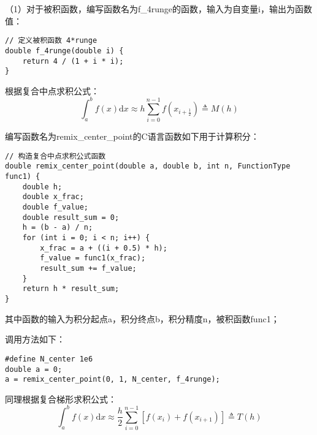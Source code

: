 \documentclass{homework}
\begin{document}

\jie （1）对于被积函数，编写函数名为f\_4runge的函数，输入为自变量i，输出为函数值：
\begin{lstlisting}
// 定义被积函数 4*runge
double f_4runge(double i) {
    return 4 / (1 + i * i);
}
\end{lstlisting}

根据复合中点求积公式：
\begin{equation}
    \int_a^bf(x)\mathrm{d}x\approx h\sum_{i=0}^{n-1}f(x_{i+\frac{1}{2}})\triangleq M(h)
\end{equation}

编写函数名为remix\_center\_point的C语言函数如下用于计算积分：
\begin{lstlisting}
// 构造复合中点求积公式函数
double remix_center_point(double a, double b, int n, FunctionType func1) {
    double h;
    double x_frac;
    double f_value;
    double result_sum = 0;
    h = (b - a) / n;
    for (int i = 0; i < n; i++) {
        x_frac = a + ((i + 0.5) * h); 
        f_value = func1(x_frac);
        result_sum += f_value;
    }
    return h * result_sum;
}
\end{lstlisting}

其中函数的输入为积分起点a，积分终点b，积分精度n，被积函数func1；

调用方法如下：
\begin{lstlisting}
#define N_center 1e6
double a = 0;
a = remix_center_point(0, 1, N_center, f_4runge);
\end{lstlisting}
\clearpage
同理根据复合梯形求积公式：
\begin{equation}
    \int_a^b f(x)\mathrm{d}x\approx \frac{h}{2}\sum_{i=0}^{n-1}\left[f(x_i)+f(x_{i+1})\right]\triangleq T(h)
\end{equation}
\end{document}
